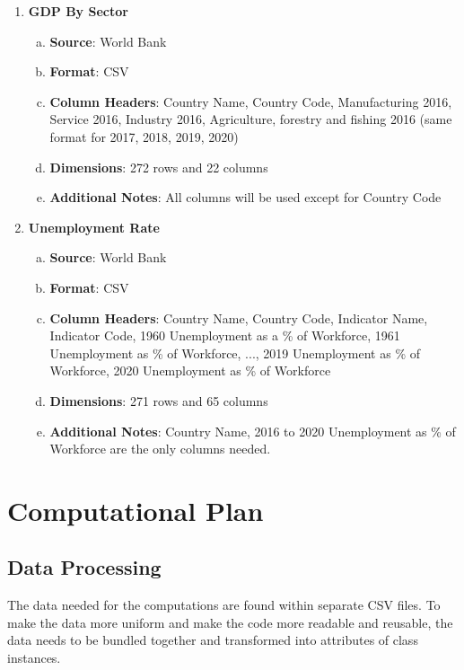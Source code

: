 \documentclass[fontsize=11pt]{article}
\begin{document}
\begin{enumerate}
    \item \textbf{GDP By Sector}
        \begin{enumerate}[(a)]
            \item \textbf{Source}: World Bank
            \item \textbf{Format}: CSV
            \item \textbf{Column Headers}: Country Name, Country Code, Manufacturing 2016, Service 2016, Industry 2016, Agriculture, forestry and fishing 2016 (same format for 2017, 2018, 2019, 2020)
            \item \textbf{Dimensions}: 272 rows and 22 columns
            \item \textbf{Additional Notes}: All columns will be used except for Country Code
        \end{enumerate}
    \item \textbf{Unemployment Rate}
        \begin{enumerate}[(a)]
            \item \textbf{Source}: World Bank
            \item \textbf{Format}: CSV
            \item \textbf{Column Headers}: Country Name, Country Code, Indicator Name, Indicator Code, 1960 Unemployment as a \% of Workforce, 1961 Unemployment as \% of Workforce, ..., 2019 Unemployment as \% of Workforce, 2020 Unemployment as \% of Workforce
            \item \textbf{Dimensions}: 271 rows and 65 columns
            \item \textbf{Additional Notes}: Country Name, 2016 to 2020 Unemployment as \% of Workforce are the only columns needed.
        \end{enumerate}
\end{enumerate}









\section*{Computational Plan}
    \subsection*{Data Processing}
    The data needed for the computations are found within separate CSV files. To make the data more uniform and make the code more readable and reusable, the data needs to be bundled together and transformed into attributes of class instances. \\
\end{document}

